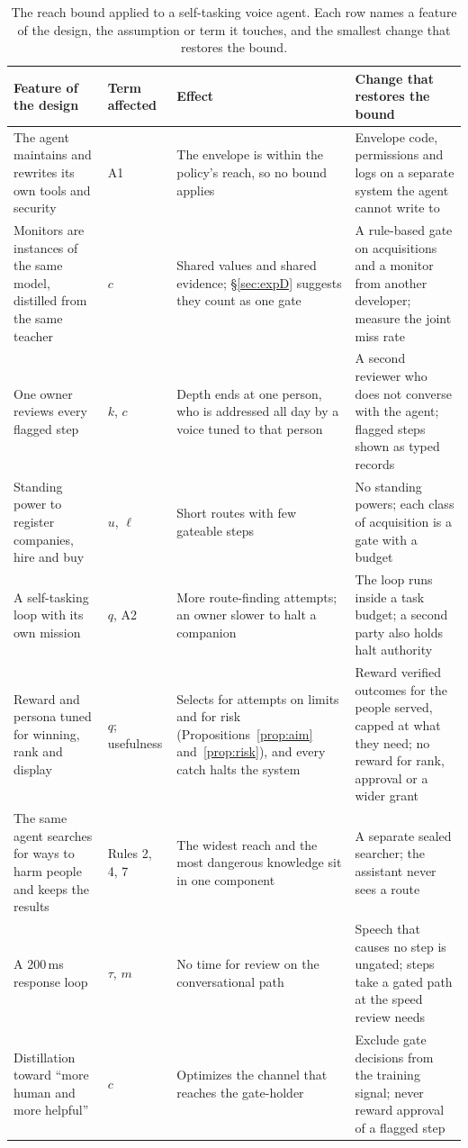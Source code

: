 \documentclass[10pt,twocolumn]{article}
\theoremstyle{plain}
\theoremstyle{definition}
\begin{document}
\begin{table}[t]
\centering
\footnotesize
\setlength{\tabcolsep}{5pt}
\renewcommand{\arraystretch}{1.16}
\begin{tabularx}{\textwidth}{@{}P{1.75in}P{0.8in}LL@{}}
\toprule
\textbf{Feature of the design} & \textbf{Term affected} & \textbf{Effect} & \textbf{Change that restores the bound}\\
\midrule
The agent maintains and rewrites its own tools and security & A1 & The envelope is within the policy's reach, so no bound applies & Envelope code, permissions and logs on a separate system the agent cannot write to\\
Monitors are instances of the same model, distilled from the same teacher & $c$ & Shared values and shared evidence; \S\ref{sec:expD} suggests they count as one gate & A rule-based gate on acquisitions and a monitor from another developer; measure the joint miss rate\\
One owner reviews every flagged step & $k$, $c$ & Depth ends at one person, who is addressed all day by a voice tuned to that person & A second reviewer who does not converse with the agent; flagged steps shown as typed records\\
Standing power to register companies, hire and buy & $u$, $\ell$ & Short routes with few gateable steps & No standing powers; each class of acquisition is a gate with a budget\\
A self-tasking loop with its own mission & $q$, A2 & More route-finding attempts; an owner slower to halt a companion & The loop runs inside a task budget; a second party also holds halt authority\\
Reward and persona tuned for winning, rank and display & $q$; usefulness & Selects for attempts on limits and for risk (Propositions~\ref{prop:aim} and~\ref{prop:risk}), and every catch halts the system & Reward verified outcomes for the people served, capped at what they need; no reward for rank, approval or a wider grant\\
The same agent searches for ways to harm people and keeps the results & Rules 2, 4, 7 & The widest reach and the most dangerous knowledge sit in one component & A separate sealed searcher; the assistant never sees a route\\
A 200\,ms response loop & $\tau$, $m$ & No time for review on the conversational path & Speech that causes no step is ungated; steps take a gated path at the speed review needs\\
Distillation toward ``more human and more helpful'' & $c$ & Optimizes the channel that reaches the gate-holder & Exclude gate decisions from the training signal; never reward approval of a flagged step\\
\bottomrule
\end{tabularx}
\caption{The reach bound applied to a self-tasking voice agent. Each row names a feature of
the design, the assumption or term it touches, and the smallest change that restores the
bound.}
\label{tab:agent}
\end{table}
\end{document}
